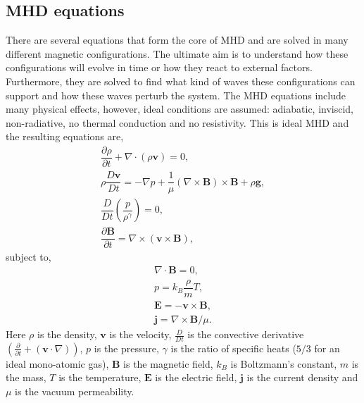 \subsection{MHD equations}
\label{mhd_eq}

    There are several equations that form the core of MHD and are solved in many different magnetic configurations. 
    The ultimate aim is to understand how these configurations will evolve in time or how they react to external factors.
    Furthermore, they are solved to find what kind of waves these configurations can support and how these waves perturb the system. 
    The MHD equations include many physical effects, however, ideal conditions are assumed: adiabatic, inviscid, non-radiative, no thermal conduction and no resistivity.
    This is ideal MHD and the resulting equations are,
    \begin{align}                                                         
        \dfrac{\partial \rho }{\partial t} + \nabla \cdot (\rho \boldsymbol{{v}}) =       
        0,\tag{Mass Conservation}\\                                  
        \rho \dfrac{{D}\boldsymbol{{v}}}{{D}t} =
        -\nabla p + \dfrac{1}{\mu}(\nabla \times \boldsymbol{{B}}) \times \boldsymbol{{B}} + \rho \boldsymbol{{g}},\tag{Equation of Motion}\\
        \dfrac{{D}}{{D}t} \left(\dfrac{p}{\rho^\gamma} \right)  = 0,\tag{Energy Equation}\\       
        \dfrac{\partial \boldsymbol{{B}}}{\partial t} = \nabla \times (\boldsymbol{{v}} \times \boldsymbol{{B}}),\tag{Induction Equation}               
    \end{align}
    subject to,
    \begin{align}
        \nabla \cdot \boldsymbol{{B}} = 0,\tag{Solenoid Equation}\\
        p = {k_B} \dfrac{\rho}{{m}} {T},\tag{Ideal Gas Law}\\  
        \boldsymbol{{E}} = - \boldsymbol{{v}} \times \boldsymbol{{B}},\tag{Ohm's Law}\\
        \boldsymbol{{j}} = \nabla \times \boldsymbol{{B}}/ \mu.\tag{Electric Current}                          
    \end{align}
    Here $\rho$ is the density, $\boldsymbol{{v}}$ is the velocity, $\frac{{D}}{{D}t}$ is the convective derivative $\left(\frac{\partial}{\partial t} + (\boldsymbol{{v}}\cdot\nabla)\right)$, $p$ is the pressure, $\gamma$ is the ratio of specific heats ($5/3$ for an ideal mono-atomic gas), $\boldsymbol{{B}}$ is the magnetic field, ${k_B}$ is Boltzmann's constant, ${m}$ is the mass, ${T}$ is the temperature, $\boldsymbol{{E}}$ is the electric field, $\boldsymbol{{j}}$ is the current density and $\mu$ is the vacuum permeability. 

